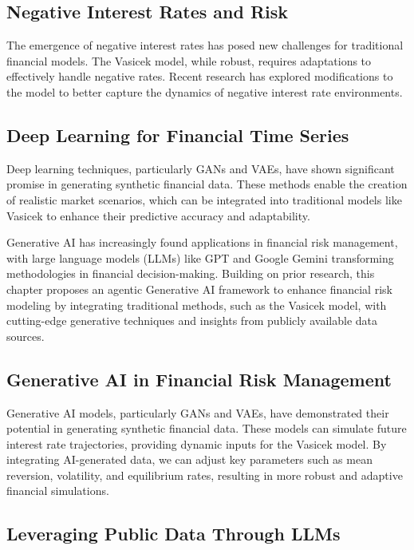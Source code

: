 \documentclass[a4paper,headinclude=on,footinclude=on,12pt,oneside]{scrbook}
\begin{document}
	\subsection{Negative Interest Rates and Risk}
	
	The emergence of negative interest rates has posed new challenges for traditional financial models. The Vasicek model, while robust, requires adaptations to effectively handle negative rates. Recent research has explored modifications to the model to better capture the dynamics of negative interest rate environments.
	
	\subsection{Deep Learning for Financial Time Series}
	
	Deep learning techniques, particularly GANs and VAEs, have shown significant promise in generating synthetic financial data. These methods enable the creation of realistic market scenarios, which can be integrated into traditional models like Vasicek to enhance their predictive accuracy and adaptability.
	
	
	Generative AI has increasingly found applications in financial risk management, with large language models (LLMs) like GPT and Google Gemini transforming methodologies in financial decision-making. Building on prior research, this chapter proposes an agentic Generative AI framework to enhance financial risk modeling by integrating traditional methods, such as the Vasicek model, with cutting-edge generative techniques and insights from publicly available data sources.
	
	\subsection{Generative AI in Financial Risk Management}
	
	Generative AI models, particularly GANs and VAEs, have demonstrated their potential in generating synthetic financial data. These models can simulate future interest rate trajectories, providing dynamic inputs for the Vasicek model. By integrating AI-generated data, we can adjust key parameters such as mean reversion, volatility, and equilibrium rates, resulting in more robust and adaptive financial simulations.
	
	\subsection{Leveraging Public Data Through LLMs}
	
\end{document}
